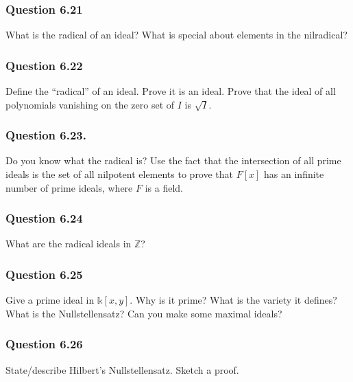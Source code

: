 \hypertarget{question-6.21}{%
\subsubsection{Question 6.21}\label{question-6.21}}

What is the radical of an ideal? What is special about elements in the
nilradical?

\hypertarget{question-6.22}{%
\subsubsection{Question 6.22}\label{question-6.22}}

Define the ``radical'' of an ideal. Prove it is an ideal. Prove that the
ideal of all polynomials vanishing on the zero set of \(I\) is
\(\sqrt{I}\).

\hypertarget{question-6.23.}{%
\subsubsection{Question 6.23.}\label{question-6.23.}}

Do you know what the radical is? Use the fact that the intersection of
all prime ideals is the set of all nilpotent elements to prove that
\(F [x]\) has an infinite number of prime ideals, where \(F\) is a
field.

\hypertarget{question-6.24}{%
\subsubsection{Question 6.24}\label{question-6.24}}

What are the radical ideals in \({\mathbb{Z}}\)?

\hypertarget{question-6.25}{%
\subsubsection{Question 6.25}\label{question-6.25}}

Give a prime ideal in \({\mathbb{k}}[x, y]\). Why is it prime? What is
the variety it defines? What is the Nullstellensatz? Can you make some
maximal ideals?

\hypertarget{question-6.26}{%
\subsubsection{Question 6.26}\label{question-6.26}}

State/describe Hilbert's Nullstellensatz. Sketch a proof.

